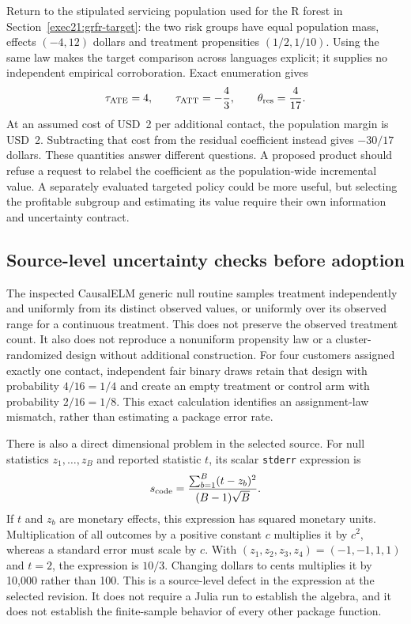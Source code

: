Return to the stipulated servicing population used for the R forest in
Section~\ref{exec21:grfr-target}: the two risk groups have equal population
mass, effects $(-4,12)$ dollars and treatment propensities $(1/2,1/10)$.
Using the same law makes the target comparison across languages explicit;
it supplies no independent empirical corroboration. Exact enumeration gives
\begin{equation}
\label{exec21:effects-targetexample}
 \tau_{\rm ATE}=4,\qquad
 \tau_{\rm ATT}=-\frac43,\qquad
 \theta_{\rm res}=\frac4{17}.
\end{equation}
At an assumed cost of USD~2 per additional contact, the population margin is
USD~2. Subtracting that cost from the residual coefficient instead gives
$-30/17$ dollars. These quantities answer different questions. A proposed
product should refuse a request to relabel the coefficient as the
population-wide incremental value. A separately evaluated targeted policy
could be more useful, but selecting the profitable subgroup and estimating
its value require their own information and uncertainty contract.
\cite{exec21_effects_reference}

\subsection{Source-level uncertainty checks before adoption}
\label{exec21:effects-uncertainty}

The inspected CausalELM generic null routine samples treatment independently
and uniformly from its distinct observed values, or uniformly over its
observed range for a continuous treatment. This does not preserve the
observed treatment count. It also does not reproduce a nonuniform propensity
law or a cluster-randomized design without additional construction. For four
customers assigned exactly one contact, independent fair binary draws retain
that design with probability $4/16=1/4$ and create an empty treatment or
control arm with probability $2/16=1/8$. This exact calculation identifies an
assignment-law mismatch, rather than estimating a package error rate.
\cite{exec21_effects_causalelm,exec21_effects_reference}

There is also a direct dimensional problem in the selected source. For null
statistics $z_1,\ldots,z_B$ and reported statistic $t$, its scalar
\texttt{stderr} expression is
\begin{equation}
\label{exec21:effects-scale}
 s_{\rm code}=\frac{\sum_{b=1}^{B}(t-z_b)^2}{(B-1)\sqrt B}.
\end{equation}
If $t$ and $z_b$ are monetary effects, this expression has squared monetary
units. Multiplication of all outcomes by a positive constant $c$ multiplies
it by $c^2$, whereas a standard error must scale by $c$. With
$(z_1,z_2,z_3,z_4)=(-1,-1,1,1)$ and $t=2$, the expression is $10/3$.
Changing dollars to cents multiplies it by 10,000 rather than 100. This is a
source-level defect in the expression at the selected revision. It does not
require a Julia run to establish the algebra, and it does not establish the
finite-sample behavior of every other package function.
\cite{exec21_effects_causalelm,exec21_effects_reference}

